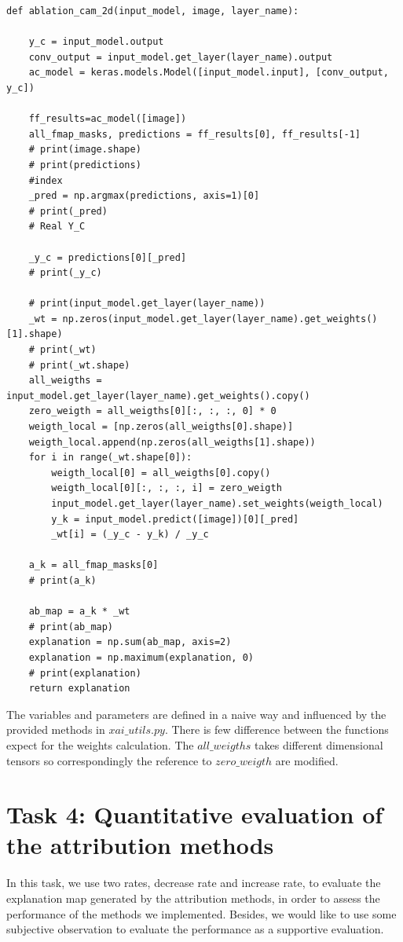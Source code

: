 \documentclass[conference]{IEEEtran}
\begin{document}
\begin{lstlisting}
def ablation_cam_2d(input_model, image, layer_name):

    y_c = input_model.output
    conv_output = input_model.get_layer(layer_name).output
    ac_model = keras.models.Model([input_model.input], [conv_output, y_c])

    ff_results=ac_model([image])
    all_fmap_masks, predictions = ff_results[0], ff_results[-1]
    # print(image.shape)
    # print(predictions)
    #index
    _pred = np.argmax(predictions, axis=1)[0]
    # print(_pred)
    # Real Y_C

    _y_c = predictions[0][_pred]
    # print(_y_c)

    # print(input_model.get_layer(layer_name))
    _wt = np.zeros(input_model.get_layer(layer_name).get_weights()[1].shape)
    # print(_wt)
    # print(_wt.shape)
    all_weigths = input_model.get_layer(layer_name).get_weights().copy()
    zero_weigth = all_weigths[0][:, :, :, 0] * 0
    weigth_local = [np.zeros(all_weigths[0].shape)]
    weigth_local.append(np.zeros(all_weigths[1].shape))
    for i in range(_wt.shape[0]):
        weigth_local[0] = all_weigths[0].copy()
        weigth_local[0][:, :, :, i] = zero_weigth
        input_model.get_layer(layer_name).set_weights(weigth_local)
        y_k = input_model.predict([image])[0][_pred]
        _wt[i] = (_y_c - y_k) / _y_c

    a_k = all_fmap_masks[0]
    # print(a_k)

    ab_map = a_k * _wt
    # print(ab_map)
    explanation = np.sum(ab_map, axis=2)
    explanation = np.maximum(explanation, 0)
    # print(explanation)
    return explanation
\end{lstlisting}

The variables and parameters are defined in a naive way and influenced by the provided methods in $xai\_utils.py$. There is few difference between the functions expect for the weights calculation. The $all\_weigths$ takes different dimensional tensors so correspondingly the reference to $zero\_weigth$ are modified.

\section{Task 4: Quantitative evaluation of the attribution methods}

In this task, we use two rates, decrease rate and increase rate, to evaluate the explanation map generated by the attribution methods, in order to assess the performance of the methods we implemented. Besides, we would like to use some subjective observation to evaluate the performance as a supportive evaluation.
\end{document}
